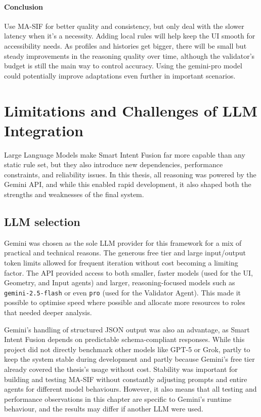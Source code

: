 \documentclass[openany]{book}
\begin{document}
\paragraph{Conclusion}
Use MA-SIF for better quality and consistency, but only deal with the slower latency when it’s a necessity. Adding local rules will help keep the UI smooth for accessibility needs. As profiles and histories get bigger, there will be small but steady improvements in the reasoning quality over time, although the validator’s budget is still the main way to control accuracy. Using the gemini-pro model could potentially improve adaptations even further in important scenarios.

\section{Limitations and Challenges of LLM Integration}
Large Language Models make Smart Intent Fusion far more capable than any static rule set, but they also introduce new dependencies, performance constraints, and reliability issues. In this thesis, all reasoning was powered by the Gemini API, and while this enabled rapid development, it also shaped both the strengths and weaknesses of the final system.

\subsection{LLM selection}
Gemini was chosen as the sole LLM provider for this framework for a mix of practical and technical reasons. The generous free tier and large input/output token limits allowed for frequent iteration without cost becoming a limiting factor. The API provided access to both smaller, faster models (used for the UI, Geometry, and Input agents) and larger, reasoning-focused models such as \texttt{gemini-2.5-flash} or even \texttt{pro} (used for the Validator Agent). This made it possible to optimise speed where possible and allocate more resources to roles that needed deeper analysis.

Gemini’s handling of structured JSON output was also an advantage, as Smart Intent Fusion depends on predictable schema-compliant responses. While this project did not directly benchmark other models like GPT-5 or Grok, partly to keep the system stable during development and partly because Gemini’s free tier already covered the thesis’s usage without cost. Stability was important for building and testing MA-SIF without constantly adjusting prompts and entire agents for different model behaviours. However, it also means that all testing and performance observations in this chapter are specific to Gemini’s runtime behaviour, and the results may differ if another LLM were used.
\end{document}
